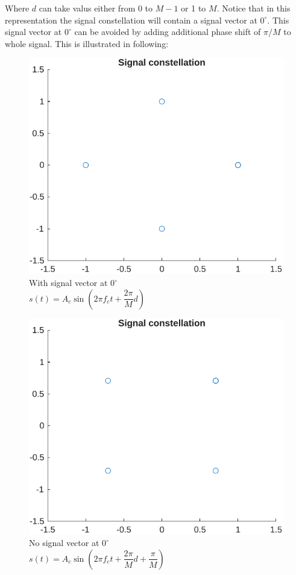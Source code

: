 Where $d$ can take valus either from 0 to $M-1$ or 1 to $M$. Notice that in this representation the signal constellation will contain a signal vector at $0^\circ$. This signal vector at $0^\circ$ can be avoided by adding additional phase shift of $\pi / M$ to whole signal. This is illustrated in following:
\\[10pt]
\begin{figure}[!ht]
	\begin{minipage}[t]{.45\textwidth}
		\centering
		\includegraphics[width=\linewidth]{img/0ps.pdf}
\\[10pt]
		With signal vector at $0^\circ$ \\[5pt]
		$s(t) = A_c \sin\left(2 \pi f_c t + \dfrac{2\pi}{M} d\right)$
	\end{minipage}\hfill%
	\begin{minipage}[t]{.45\textwidth}
		\centering
		\includegraphics[width=\linewidth]{img/ps.pdf}
\\[10pt]
		No signal vector at $0^\circ$ \\[5pt]
		$s(t) = A_c \sin\left(2 \pi f_c t + \dfrac{2\pi}{M} d + \dfrac{\pi}{M}\right)$
	\end{minipage}
\end{figure}

